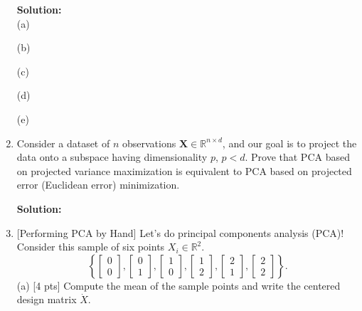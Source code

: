 \documentclass[10pt]{article}
\begin{document}
\begin{enumerate}[1.]
\textbf{Solution:}\\
(a) 



(b)




(c)






(d)



(e)








\newpage 
    \item {} Consider a dataset of $n$ observations $\mathbf{X}\in         \mathbb{R}^{n \times d}$, and our goal is to project the data onto a           subspace having dimensionality $p$, $p<d$. 
	Prove that PCA based on projected variance maximization is equivalent to       PCA based on projected error (Euclidean error) minimization. \par
\textbf{Solution:}\\
	










\newpage
 \item {} [Performing PCA by Hand]
 Let's do principal components analysis (PCA)! Consider this sample of six points $X_i \in \mathbb{R}^2$.
$$
\left\{\left[\begin{array}{l}
0 \\
0
\end{array}\right],\left[\begin{array}{l}
0 \\
1
\end{array}\right],\left[\begin{array}{l}
1 \\
0
\end{array}\right],\left[\begin{array}{l}
1 \\
2
\end{array}\right],\left[\begin{array}{l}
2 \\
1
\end{array}\right],\left[\begin{array}{l}
2 \\
2
\end{array}\right]\right\} .
$$
(a) [4 pts] Compute the mean of the sample points and write the centered design matrix $\dot{X}$.


\end{enumerate}
\end{document}
